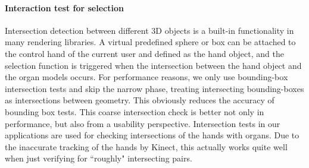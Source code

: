 \paragraph{Interaction test for selection}
Intersection detection between different 3D objects is a built-in functionality in many rendering libraries. A virtual predefined sphere or box can be attached to the control hand of the current user and defined as the hand object, and the selection function is triggered when the intersection between the hand object and the organ models occurs. 
For performance reasons, we only use bounding-box intersection tests and skip the narrow phase, treating intersecting bounding-boxes as intersections between geometry. This obviously reduces the accuracy of bounding box tests. This coarse intersection check is better not only in performance, but also from a usability perspective. Intersection tests in our applications are used for checking intersections of the hands with organs. Due to the inaccurate tracking of the hands by Kinect, this actually works quite well when just verifying for ``roughly" intersecting pairs.

